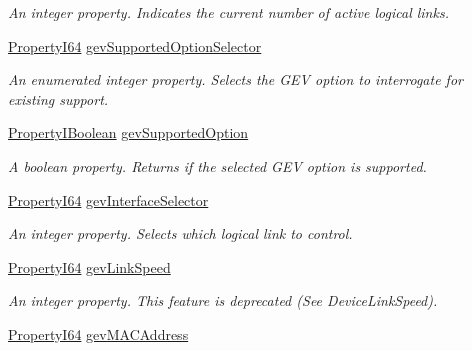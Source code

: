 \begin{DoxyCompactItemize}
\begin{DoxyCompactList}\small\item\em An integer property. Indicates the current number of active logical links. \end{DoxyCompactList}\item 
\hyperlink{group___common_interface_ga81749b2696755513663492664a18a893}{Property\+I64} \hyperlink{classmv_i_m_p_a_c_t_1_1acquire_1_1_gen_i_cam_1_1_transport_layer_control_aed28fb96d13bd5c11c8a15641d41559e}{gev\+Supported\+Option\+Selector}
\begin{DoxyCompactList}\small\item\em An enumerated integer property. Selects the G\+E\+V option to interrogate for existing support. \end{DoxyCompactList}\item 
\hyperlink{group___common_interface_ga44f9437e24b21b6c93da9039ec6786aa}{Property\+I\+Boolean} \hyperlink{classmv_i_m_p_a_c_t_1_1acquire_1_1_gen_i_cam_1_1_transport_layer_control_aa8bd58b91d3a71e73c8b0c66fe79ea90}{gev\+Supported\+Option}
\begin{DoxyCompactList}\small\item\em A boolean property. Returns if the selected G\+E\+V option is supported. \end{DoxyCompactList}\item 
\hyperlink{group___common_interface_ga81749b2696755513663492664a18a893}{Property\+I64} \hyperlink{classmv_i_m_p_a_c_t_1_1acquire_1_1_gen_i_cam_1_1_transport_layer_control_a5fcd75643ac8f2d5479bc07f6ea39bdb}{gev\+Interface\+Selector}
\begin{DoxyCompactList}\small\item\em An integer property. Selects which logical link to control. \end{DoxyCompactList}\item 
\hyperlink{group___common_interface_ga81749b2696755513663492664a18a893}{Property\+I64} \hyperlink{classmv_i_m_p_a_c_t_1_1acquire_1_1_gen_i_cam_1_1_transport_layer_control_aeac93feac8dfefc51bf1f699f82bc329}{gev\+Link\+Speed}
\begin{DoxyCompactList}\small\item\em An integer property. This feature is deprecated (See Device\+Link\+Speed). \end{DoxyCompactList}\item 
\hyperlink{group___common_interface_ga81749b2696755513663492664a18a893}{Property\+I64} \hyperlink{classmv_i_m_p_a_c_t_1_1acquire_1_1_gen_i_cam_1_1_transport_layer_control_adcab47e95dd9a7372819c1485faaf62a}{gev\+M\+A\+C\+Address}

\end{DoxyCompactItemize}

